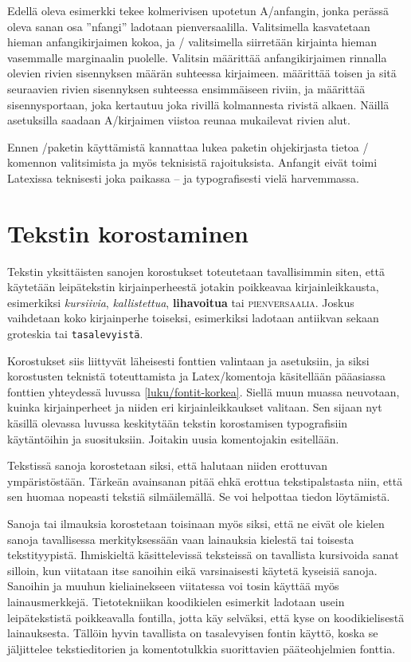 \noindent
Edellä oleva esimerkki tekee kolmerivisen upotetun A\-/anfangin, jonka
perässä oleva sanan osa ''nfangi'' ladotaan pienversaalilla.
Valitsimella  kasvatetaan hieman anfangikirjaimen
kokoa, ja \-/ valitsimella siirretään kirjainta hieman
vasemmalle marginaalin puolelle. Valitsin  määrittää
anfangikirjaimen rinnalla olevien rivien sisennyksen määrän suhteessa
kirjaimeen.  määrittää toisen ja sitä seuraavien rivien
sisennyksen suhteessa ensimmäiseen riviin, ja  määrittää
sisennysportaan, joka kertautuu joka rivillä kolmannesta rivistä alkaen.
Näillä asetuksilla saadaan A\-/kirjaimen viistoa reunaa mukailevat
rivien alut.

Ennen \-/paketin käyttämistä kannattaa lukea paketin
ohjekirjasta tietoa \-/ komennon valitsimista ja myös
teknisistä rajoituksista. Anfangit eivät toimi Latexissa teknisesti joka
paikassa -- ja typografisesti vielä harvemmassa.

\section{Tekstin korostaminen}
\label{luku/korostus}

Tekstin yksittäisten sanojen korostukset toteutetaan tavallisimmin
siten, että käytetään leipätekstin kirjainperheestä jotakin poikkeavaa
kirjainleikkausta, esimerkiksi \textit{kursiivia},
\textsl{kallistettua}, \textbf{lihavoitua} tai \textsc{pienversaalia}.
Joskus vaihdetaan koko kirjainperhe toiseksi, esimerkiksi ladotaan
\textrm{antiikvan} sekaan \textsf{groteskia} tai \texttt{tasalevyistä}.

Korostukset siis liittyvät läheisesti fonttien valintaan ja asetuksiin,
ja siksi korostusten teknistä toteuttamista ja Latex\-/komentoja
käsitellään pääasiassa fonttien yhteydessä luvussa
\ref{luku/fontit-korkea}. Siellä muun muassa neuvotaan, kuinka
kirjainperheet ja niiden eri kirjainleikkaukset valitaan. Sen sijaan nyt
käsillä olevassa luvussa keskitytään tekstin korostamisen typografisiin
käytäntöihin ja suosituksiin. Joitakin uusia komentojakin esitellään.

Tekstissä sanoja korostetaan siksi, että halutaan niiden erottuvan
ympäristöstään. Tärkeän avainsanan pitää ehkä erottua tekstipalstasta
niin, että sen huomaa nopeasti tekstiä silmäilemällä. Se voi helpottaa
tiedon löytämistä.

Sanoja tai ilmauksia korostetaan toisinaan myös siksi, että ne eivät ole
kielen sanoja tavallisessa merkityksessään vaan lainauksia kielestä tai
toisesta tekstityypistä. Ihmiskieltä käsittelevissä teksteissä on
tavallista kursivoida sanat silloin, kun viitataan itse sanoihin eikä
varsinaisesti käytetä kyseisiä sanoja. Sanoihin ja muuhun kieliainekseen
viitatessa voi tosin käyttää myös lainausmerkkejä. Tietotekniikan
koodikielen esimerkit ladotaan usein leipätekstistä poikkeavalla
fontilla, jotta käy selväksi, että kyse on koodikielisestä lainauksesta.
Tällöin hyvin tavallista on tasalevyisen fontin käyttö, koska se
jäljittelee tekstieditorien ja komentotulkkia suorittavien
pääteohjelmien fonttia.

